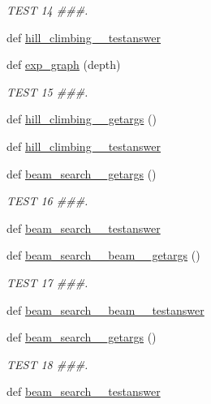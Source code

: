 \begin{DoxyCompactItemize}
\begin{DoxyCompactList}\small\item\em T\+E\+S\+T 14 \#\#\#. \end{DoxyCompactList}\item 
def \hyperlink{namespacetests_a78b364cfa705dde7242107723652d8f3}{hill\+\_\+climbing\+\_\+\_\+testanswer}
\item 
def \hyperlink{namespacetests_a92e10d86ba4b16c56f82cfb53b87747e}{exp\+\_\+graph} (depth)
\begin{DoxyCompactList}\small\item\em T\+E\+S\+T 15 \#\#\#. \end{DoxyCompactList}\item 
def \hyperlink{namespacetests_af524d427a18dc7f920488379d9a69b72}{hill\+\_\+climbing\+\_\+\_\+getargs} ()
\item 
def \hyperlink{namespacetests_a79964cddc8958ff3c6c4ef4e564ebee3}{hill\+\_\+climbing\+\_\+\_\+testanswer}
\item 
def \hyperlink{namespacetests_a5074d16399468f9f26b187c3d2be5a58}{beam\+\_\+search\+\_\+\_\+getargs} ()
\begin{DoxyCompactList}\small\item\em T\+E\+S\+T 16 \#\#\#. \end{DoxyCompactList}\item 
def \hyperlink{namespacetests_a2cc72b2062c23275c2e5f87219ef382e}{beam\+\_\+search\+\_\+\_\+testanswer}
\item 
def \hyperlink{namespacetests_a12d18bd1ca85dd50b84292573f2690cd}{beam\+\_\+search\+\_\+\_\+beam\+\_\+\_\+getargs} ()
\begin{DoxyCompactList}\small\item\em T\+E\+S\+T 17 \#\#\#. \end{DoxyCompactList}\item 
def \hyperlink{namespacetests_a8d0d806b0b301accdff0827768660178}{beam\+\_\+search\+\_\+\_\+beam\+\_\+\_\+testanswer}
\item 
def \hyperlink{namespacetests_acc39990acfbd3c25ba4198651b504e7a}{beam\+\_\+search\+\_\+\_\+getargs} ()
\begin{DoxyCompactList}\small\item\em T\+E\+S\+T 18 \#\#\#. \end{DoxyCompactList}\item 
def \hyperlink{namespacetests_a3d4687379bd04894d78f2e7058397001}{beam\+\_\+search\+\_\+\_\+testanswer}
\item 

\end{DoxyCompactItemize}
